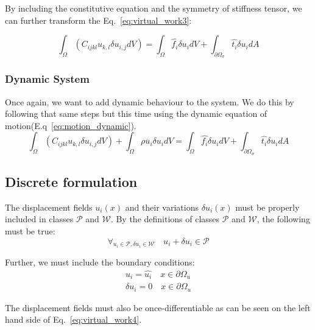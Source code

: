 \documentclass[en]{minipw} %
\begin{document}
By including the constitutive equation and the symmetry of stiffness tensor, we can further transform the Eq.~\ref{eq:virtual_work3}:

\begin{equation}
\label{eq:virtual_work4}
\int_{\Omega}(C_{ijkl} u_{k,l} \delta u_{i,j} dV ) = \int_{\Omega} \hat{f_i} \delta u_{i} dV + \int_{\partial \Omega_{\sigma}} \hat{t_i} \delta u_{i} dA
\end{equation}

\subsubsection{Dynamic System}
Once again, we want to add dynamic behaviour to the system. We do this by following that same steps but this time using the dynamic equation of motion(E.q~\ref{eq:motion_dynamic}).
\begin{equation}
\label{eq:virtual_work_dynamic4}
\int_{\Omega}(C_{ijkl} u_{k,l} \delta u_{i,j} dV ) + \int_{\Omega}\rho \ddot{u_i} \delta u_i dV = \int_{\Omega} \hat{f_i} \delta u_{i} dV + \int_{\partial \Omega_{\sigma}} \hat{t_i} \delta u_{i} dA
\end{equation}

\subsection{Discrete formulation}

The displacement fields $u_{i}(x)$ and their variations $\delta u_{i}(x)$ must be properly included in classes $\mathcal{P}$ and $\mathcal{W}$. By the definitions of classes $\mathcal{P}$ and $\mathcal{W}$, the following must be true:
\begin{equation}
\forall_{u_{i} \in \mathcal{P}, \delta u_{i} \in \mathcal{W}} \quad u_i + \delta u_i \in \mathcal{P}
\end{equation}

Further, we must include the boundary conditions:
\begin{equation}
\begin{aligned}
u_i = \hat{u_i} \quad x \in \partial  \Omega_{u}
\\
\delta u_i = 0 \quad x \in \partial  \Omega_{u}
\end{aligned}
\end{equation}

The displacement fields must also be once-differentiable as can be seen on the left hand side of Eq.~\ref{eq:virtual_work4}.
\end{document}
